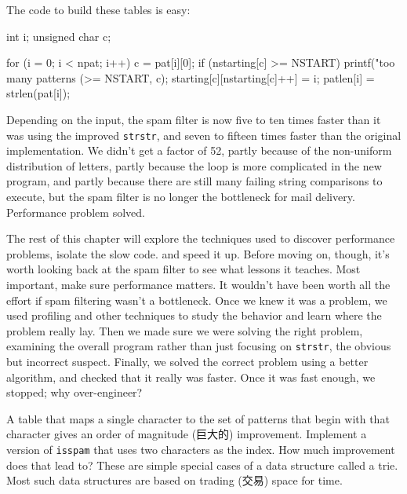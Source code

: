 \begin{figure}[h]
\begin{varwidth}[t]{\textwidth}
\end{varwidth}

\end{figure}

The code to build these tables is easy:
\begin{wellcode}
    int i;
    unsigned char c;

    for (i = 0; i < npat; i++) {
        c = pat[i][0];
        if (nstarting[c] >= NSTART)
            printf("too many patterns (>=%
                    NSTART, c);
        starting[c][nstarting[c]++] = i;
        patlen[i] = strlen(pat[i]);
    }
\end{wellcode}

Depending on the input, the spam filter is now five to ten times faster
than it was using the improved \verb'strstr', and seven to fifteen times
faster than the original implementation. We didn't get a factor of 52,
partly because of the non-uniform distribution of letters, partly because
the loop is more complicated in the new program, and partly because there
are still many failing string comparisons to execute, but the spam filter
is no longer the bottleneck for mail delivery. Performance problem solved.

The rest of this chapter will explore the techniques used to discover
performance problems, isolate the slow code. and speed it up. Before moving
on, though, it's worth looking back at the spam filter to see what lessons
it teaches. Most important, make sure performance matters. It wouldn't have
been worth all the effort if spam filtering wasn't a bottleneck. Once we
knew it was a problem, we used profiling and other techniques to study the
behavior and learn where the problem really lay. Then we made sure we were
solving the right problem, examining the overall program rather than just
focusing on \verb'strstr', the obvious but incorrect suspect. Finally, we
solved the correct problem using a better algorithm, and checked that it
really was faster. Once it was fast enough, we stopped; why over-engineer?

\begin{exercise}
    A table that maps a single character to the set of patterns that begin
    with that character gives an order of magnitude (巨大的) improvement.
    Implement a version of \verb'isspam' that uses two characters as the
    index. How much improvement does that lead to? These are simple special
    cases of a data structure called a trie. Most such data structures are
    based on trading (交易) space for time.
\end{exercise}

